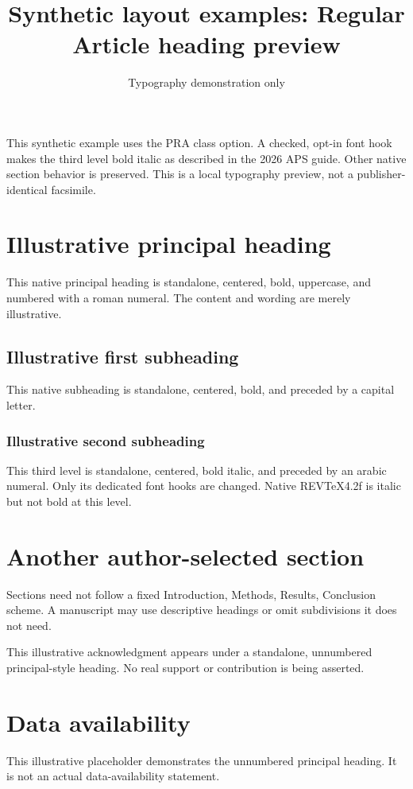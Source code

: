 \documentclass[aps,pra,reprint]{revtex4-2}
\begin{document}
\title{Synthetic layout examples: Regular Article heading preview}
\author{Typography demonstration only}\noaffiliation
\maketitle
\noindent This synthetic example uses the PRA class option. A checked, opt-in font hook makes the third level bold italic as described in the 2026 APS guide. Other native section behavior is preserved. This is a local typography preview, not a publisher-identical facsimile.

\section{Illustrative principal heading}
This native principal heading is standalone, centered, bold, uppercase, and numbered with a roman numeral. The content and wording are merely illustrative.

\subsection{Illustrative first subheading}
This native subheading is standalone, centered, bold, and preceded by a capital letter.

\subsubsection{Illustrative second subheading}
This third level is standalone, centered, bold italic, and preceded by an arabic numeral. Only its dedicated font hooks are changed. Native REVTeX4.2f is italic but not bold at this level.

\section{Another author-selected section}
Sections need not follow a fixed Introduction, Methods, Results, Conclusion scheme. A manuscript may use descriptive headings or omit subdivisions it does not need.

\begin{acknowledgments}
This illustrative acknowledgment appears under a standalone, unnumbered principal-style heading. No real support or contribution is being asserted.
\end{acknowledgments}

\section*{Data availability}
This illustrative placeholder demonstrates the unnumbered principal heading. It is not an actual data-availability statement.
\end{document}
